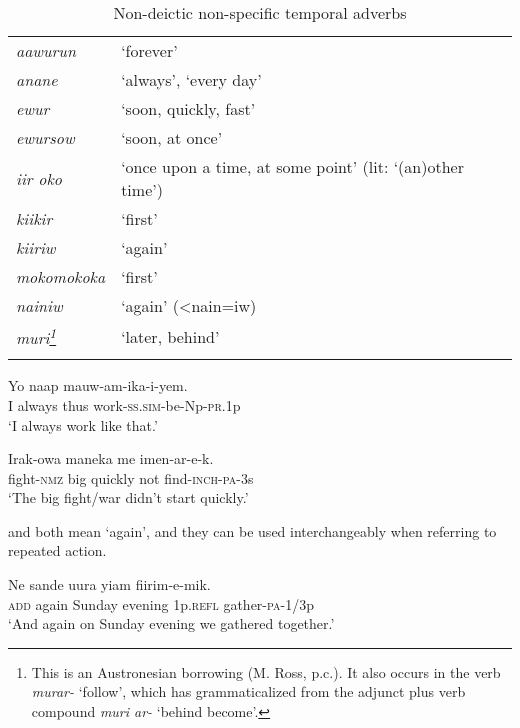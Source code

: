 \begin{table}
\caption{Non-deictic non-specific temporal adverbs}
\label{tab:3:nondeicticnonspecifictemp}

\begin{tabular}{>{\itshape}ll}
\mytoprule
aawurun &`forever'\\
anane &`always', `every day'\\
ewur &`soon, quickly, fast'\\
ewursow &`soon, at once'\\
iir oko &`once upon a time, at some point' (lit: `(an)other time')\\
kiikir &`first'\\
kiiriw &`again'\\
mokomokoka &`first'\\
nainiw &`again' ({{\textless}}nain=iw)\\
muri\footnote{This is an Austronesian borrowing (M. Ross, p.c.). It also occurs in the verb \textit{murar-} `follow', which has grammaticalized from the adjunct plus verb compound \textit{muri ar-} `behind become'.} &`later, behind'\\
\mybottomrule 
\end{tabular}

\end{table}

\ea%
\label{ex:3:x502}
\gll Yo  naap mauw-am-ika-i-yem. \\
I always thus work-\textsc{ss}.\textsc{sim}-be-Np-\textsc{pr}.1p\\
\glt`I always work like that.'
\z

\ea%
\label{ex:3:x504}
\gll Irak-owa maneka  me imen-ar-e-k. \\
fight-\textsc{nmz} big quickly not find-\textsc{inch}-\textsc{pa}-3s\\
\glt`The big fight/war didn't start quickly.'
\z

  and   both mean `again', and they can be used interchangeably when referring to repeated action.

\ea%
\label{ex:3:x697}
\gll Ne  sande uura yiam fiirim-e-mik. \\
\textsc{add} again Sunday evening 1p.\textsc{refl} gather-\textsc{pa}-1/3p\\
\glt`And again on Sunday evening we gathered together.'
\z

